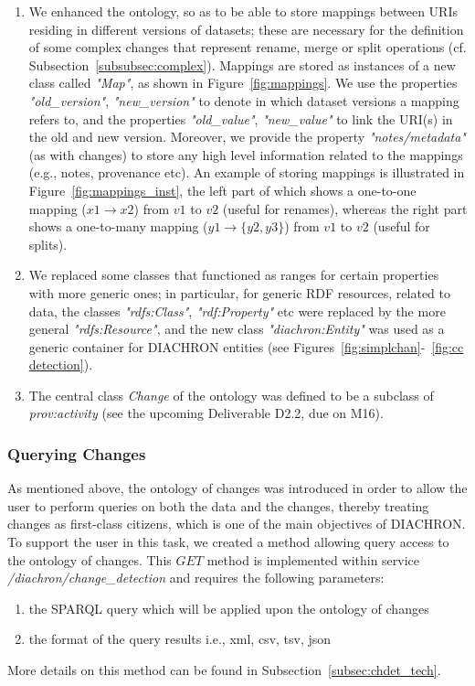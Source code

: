 \begin{enumerate}
\item We enhanced the ontology, so as to be able to store mappings between URIs residing in different versions of datasets; these are necessary for the definition of some complex changes that
represent rename, merge or split operations (cf. Subsection~\ref{subsubsec:complex}). 
Mappings are stored as instances of a new class called \textit{"Map"}, as shown in Figure~\ref{fig:mappings}. 
We use the properties \textit{"old\_version"}, \textit{"new\_version"} to denote in which dataset versions a mapping refers to, and the properties \textit{"old\_value"}, \textit{"new\_value"} to link the URI(s) in the old and new version. 
Moreover, we provide the property \textit{"notes/metadata"} (as with changes) to store any high level information related to the mappings (e.g., notes, provenance etc).
An example of storing mappings is illustrated in Figure~\ref{fig:mappings_inst}, the left part of which shows a one-to-one mapping ($x1 \rightarrow x2$) from $v1$ to $v2$ (useful for renames), 
whereas the right part shows a one-to-many mapping ($y1 \rightarrow \{y2,y3\}$) from $v1$ to $v2$ (useful for splits).

\item We replaced some classes that functioned as ranges for certain properties with more generic ones; in particular, for generic RDF resources, related to data, the classes \textit{"rdfs:Class"}, \textit{"rdf:Property"} etc were replaced by the more general \textit{"rdfs:Resource"}, and the new class \textit{"diachron:Entity"} was used as a generic container for DIACHRON entities (see Figures~\ref{fig:simplchan}-~\ref{fig:cc detection}).

\item The central class \textit{Change} of the ontology was defined to be a subclass of \textit{prov:activity} (see the upcoming Deliverable D2.2, due on M16).

\end{enumerate}

\subsubsection{Querying Changes}

As mentioned above, the ontology of changes was introduced in order to allow the user to perform queries on both the data and the changes, thereby treating changes as first-class citizens, which is one of the main objectives of DIACHRON.
To support the user in this task, we created a method allowing query access to the ontology of changes. 
This $GET$ method is implemented within service \emph{\//diachron\//change\_detection} and requires the following parameters:
\begin{enumerate}
	\item the SPARQL query which will be applied upon the ontology of changes
	\item the format of the query results i.e., xml, csv, tsv, json
\end{enumerate}
More details on this method can be found in Subsection~\ref{subsec:chdet_tech}.
